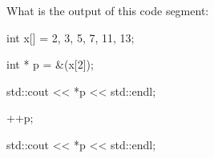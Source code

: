 What is the output of this code segment:



\begin{consolethree}[escapeinside=||]

int x[] = {2, 3, 5, 7, 11, 13};

int * p = &(x[2]);

std::cout << *p << std::endl;

++p;

std::cout << *p << std::endl;

\end{consolethree}

